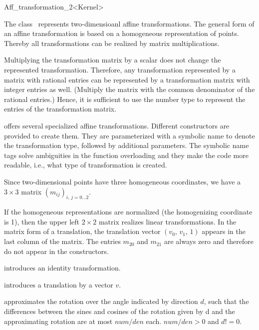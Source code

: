 \begin{ccRefClass}{Aff_transformation_2<Kernel>}

\ccDefinition
The class \ccRefName\ represents two-dimensioanl affine transformations. 
The general form of an affine transformation is based on a homogeneous
representation of points. Thereby all transformations can be realized by
matrix multiplications. 

Multiplying the transformation matrix by a scalar does not change the
represented transformation. Therefore, any transformation represented
by a matrix with rational entries can be represented by a
transformation matrix with integer entries as well. (Multiply the
matrix with the common denominator of the rational entries.) Hence, it
is sufficient to use the number type  to represent
the entries of the transformation matrix.

{\cgal} offers several specialized affine transformations. Different
constructors are provided to create them. They are parameterized with
a symbolic name to denote the transformation type, followed by
additional parameters. The symbolic name tags solve ambiguities in the
function overloading and they make the code more readable, i.e., what
type of transformation is created.

Since two-dimensional points have three homogeneous coordinates, we
have a $3\times 3$ matrix ${(m_{ij})}_{i,\,j=0\ldots 2}$.

If the homogeneous representations are normalized (the homogenizing
coordinate is 1), then the upper left $2\times 2$ matrix realizes
linear transformations. In the matrix form of a translation, the
translation vector $(v_0,\,v_1,\,1)$ appears in the last column of the
matrix. The entries $m_{20}$ and $m_{21}$ are always zero and
therefore do not appear in the constructors.

\ccCreation
{}

            {introduces an identity transformation.}

            {introduces a translation by a vector $v$.}

            {approximates the rotation over the angle indicated by direction 
             $d$, such that the differences between the sines and cosines
             of the rotation given by d and the approximating rotation
             are at most $num/den$ each.
             \ccPrecond $num/den>0$ and $d != 0$. }


\end{ccRefClass}
